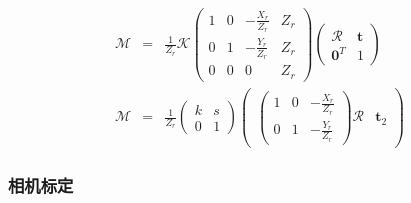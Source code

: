 \documentclass{beamer}
\newcommand{\tmmathbf}[1]{\ensuremath{\boldsymbol{#1}}}
\begin{document}
{{\begin{frame}
\begin{eqnarray*}
    \mathcal{M} & = & \frac{1}{Z_r} \mathcal{K} \left(\begin{array}{cccc}
      1 & 0 & - \frac{X_r}{Z_r} & Z_r\\
      0 & 1 & - \frac{Y_r}{Z_r} & Z_r\\
      0 & 0 & 0 & Z_r
    \end{array}\right) \left(\begin{array}{cc}
      \mathcal{R} & \tmmathbf{t}\\
      \tmmathbf{0}^T & 1
    \end{array}\right)\\
    \mathcal{M} & = & \frac{1}{Z_r} \left(\begin{array}{cc}
      k & s\\
      0 & 1
    \end{array}\right) \left(\begin{array}{cc}
      \left(\begin{array}{ccc}
        1 & 0 & - \frac{X_r}{Z_r}\\
        0 & 1 & - \frac{Y_r}{Z_r}
      \end{array}\right) \mathcal{R} & \tmmathbf{t}_2
    \end{array}\right)
  \end{eqnarray*}
\end{frame}}{\begin{frame}
  \frametitle{相机标定}
  

\end{frame}}}
\end{document}
